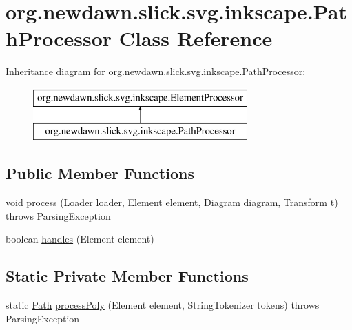\hypertarget{classorg_1_1newdawn_1_1slick_1_1svg_1_1inkscape_1_1_path_processor}{}\section{org.\+newdawn.\+slick.\+svg.\+inkscape.\+Path\+Processor Class Reference}
\label{classorg_1_1newdawn_1_1slick_1_1svg_1_1inkscape_1_1_path_processor}
Inheritance diagram for org.\+newdawn.\+slick.\+svg.\+inkscape.\+Path\+Processor\+:\begin{figure}[H]
\begin{center}
\leavevmode
\includegraphics[height=2.000000cm]{classorg_1_1newdawn_1_1slick_1_1svg_1_1inkscape_1_1_path_processor}
\end{center}
\end{figure}
\subsection*{Public Member Functions}
\begin{DoxyCompactItemize}
\item 
void \mbox{\hyperlink{classorg_1_1newdawn_1_1slick_1_1svg_1_1inkscape_1_1_path_processor_ad4019c7c724b673d4c4aaa23dd95e50e}{process}} (\mbox{\hyperlink{interfaceorg_1_1newdawn_1_1slick_1_1svg_1_1_loader}{Loader}} loader, Element element, \mbox{\hyperlink{classorg_1_1newdawn_1_1slick_1_1svg_1_1_diagram}{Diagram}} diagram, Transform t)  throws Parsing\+Exception 
\item 
boolean \mbox{\hyperlink{classorg_1_1newdawn_1_1slick_1_1svg_1_1inkscape_1_1_path_processor_a0dda8e99a9e32cfa07593e50537be812}{handles}} (Element element)
\end{DoxyCompactItemize}
\subsection*{Static Private Member Functions}
\begin{DoxyCompactItemize}
\item 
static \mbox{\hyperlink{classorg_1_1newdawn_1_1slick_1_1geom_1_1_path}{Path}} \mbox{\hyperlink{classorg_1_1newdawn_1_1slick_1_1svg_1_1inkscape_1_1_path_processor_aead19050eb87e2b4e27228ddf54b7e8e}{process\+Poly}} (Element element, String\+Tokenizer tokens)  throws Parsing\+Exception 
\end{DoxyCompactItemize}


